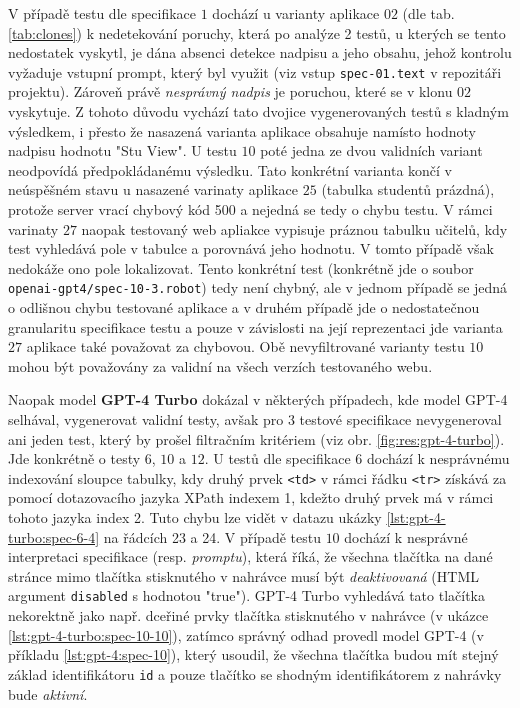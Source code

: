 \documentclass[czech, ma, kiv, he, iso690numb, pdf, viewonly]{fasthesis}
\begin{document}
            V případě testu dle specifikace \(1\) dochází u varianty aplikace \(02\) (dle tab. \ref{tab:clones}) k nedetekování poruchy, která po analýze 2 testů, u kterých se tento nedostatek vyskytl, je dána absenci detekce nadpisu a jeho obsahu, jehož kontrolu vyžaduje vstupní prompt, který byl využit (viz vstup \verb|spec-01.text| v repozitáři projektu). Zároveň právě \textit{nesprávný nadpis} je poruchou, které se v klonu \(02\) vyskytuje. Z tohoto důvodu vychází tato dvojice vygenerovaných testů s kladným výsledkem, i přesto že nasazená varianta aplikace obsahuje namísto hodnoty nadpisu  hodnotu "Stu View". U testu \(10\) poté jedna ze dvou validních variant neodpovídá předpokládanému výsledku. Tato konkrétní varianta končí v neúspěšném stavu u nasazené varinaty aplikace \(25\) (tabulka studentů prázdná), protože server vrací chybový kód 500 a nejedná se tedy o chybu testu. V rámci varinaty \(27\) naopak testovaný web apliakce vypisuje práznou tabulku učitelů, kdy test vyhledává pole v tabulce a porovnává jeho hodnotu. V tomto případě však nedokáže ono pole lokalizovat. Tento konkrétní test (konkrétně jde o soubor \verb|openai-gpt4/spec-10-3.robot|) tedy není chybný, ale v jednom případě se jedná o odlišnou chybu testované aplikace a v druhém případě jde o nedostatečnou granularitu specifikace testu a pouze v závislosti na její reprezentaci jde varianta \(27\) aplikace také považovat za chybovou. Obě nevyfiltrované varianty testu \(10\) mohou být považovány za validní na všech verzích testovaného webu. 


            Naopak model \textbf{GPT-4 Turbo} dokázal v některých případech, kde model GPT-4 selhával, vygenerovat validní testy, avšak pro 3 testové specifikace nevygeneroval ani jeden test, který by prošel filtračním kritériem (viz obr. \ref{fig:res:gpt-4-turbo}). Jde konkrétně o testy \(6\), \(10\) a \(12\). U testů dle specifikace \(6\) dochází k nesprávnému indexování sloupce tabulky, kdy druhý prvek \verb|<td>| v rámci řádku \verb|<tr>| získává za pomocí dotazovacího jazyka XPath indexem 1, kdežto druhý prvek má v rámci tohoto jazyka index 2. Tuto chybu lze vidět v datazu ukázky \ref{lst:gpt-4-turbo:spec-6-4} na řádcích 23 a 24. V případě testu \(10\) dochází k nesprávné interpretaci specifikace (resp. \emph{promptu}), která říká, že všechna tlačítka na dané stránce mimo tlačítka stisknutého v nahrávce musí být \textit{deaktivovaná} (HTML argument \verb|disabled| s hodnotou "true"). GPT-4 Turbo vyhledává tato tlačítka nekorektně jako např. dceřiné prvky tlačítka stisknutého v nahrávce (v ukázce \ref{lst:gpt-4-turbo:spec-10-10}), zatímco správný odhad provedl model GPT-4 (v příkladu \ref{lst:gpt-4:spec-10}), který usoudil, že všechna tlačítka budou mít stejný základ identifikátoru \verb|id| a pouze tlačítko se shodným identifikátorem z nahrávky bude \textit{aktivní}.
\end{document}
